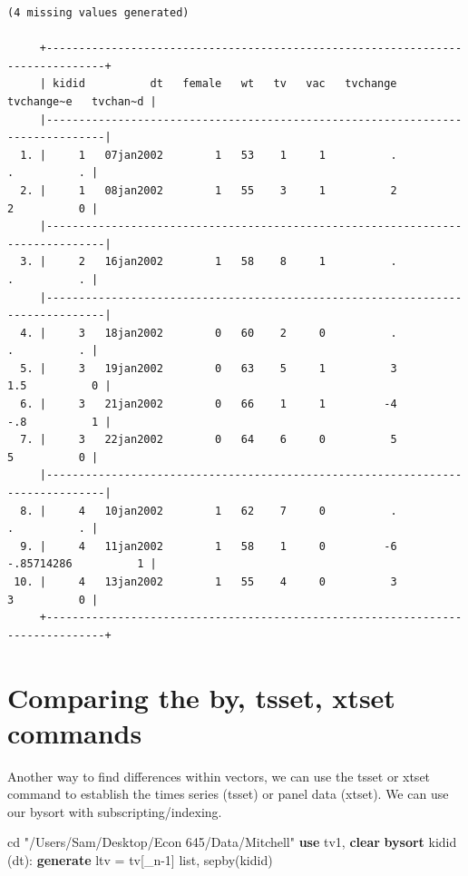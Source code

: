 \documentclass[
]{book}
\newenvironment{Shaded}{\begin{snugshade}}{\end{snugshade}}
\newcommand{\DataTypeTok}[1]{\textcolor[rgb]{0.13,0.29,0.53}{#1}}
\newcommand{\KeywordTok}[1]{\textcolor[rgb]{0.13,0.29,0.53}{\textbf{#1}}}
\newcommand{\NormalTok}[1]{#1}
\newcommand{\OtherTok}[1]{\textcolor[rgb]{0.56,0.35,0.01}{#1}}
\newcommand{\StringTok}[1]{\textcolor[rgb]{0.31,0.60,0.02}{#1}}
\begin{document}
\begin{verbatim}
(4 missing values generated)

     +-------------------------------------------------------------------------------+
     | kidid          dt   female   wt   tv   vac   tvchange   tvchange~e   tvchan~d |
     |-------------------------------------------------------------------------------|
  1. |     1   07jan2002        1   53    1     1          .            .          . |
  2. |     1   08jan2002        1   55    3     1          2            2          0 |
     |-------------------------------------------------------------------------------|
  3. |     2   16jan2002        1   58    8     1          .            .          . |
     |-------------------------------------------------------------------------------|
  4. |     3   18jan2002        0   60    2     0          .            .          . |
  5. |     3   19jan2002        0   63    5     1          3          1.5          0 |
  6. |     3   21jan2002        0   66    1     1         -4          -.8          1 |
  7. |     3   22jan2002        0   64    6     0          5            5          0 |
     |-------------------------------------------------------------------------------|
  8. |     4   10jan2002        1   62    7     0          .            .          . |
  9. |     4   11jan2002        1   58    1     0         -6   -.85714286          1 |
 10. |     4   13jan2002        1   55    4     0          3            3          0 |
     +-------------------------------------------------------------------------------+
\end{verbatim}

\section{Comparing the by, tsset, xtset commands}\label{comparing-the-by-tsset-xtset-commands}

Another way to find differences within vectors, we can use the tsset or xtset
command to establish the times series (tsset) or panel data (xtset).
We can use our bysort with subscripting/indexing.

\begin{Shaded}
\begin{Highlighting}[]
\NormalTok{cd }\StringTok{"/Users/Sam/Desktop/Econ 645/Data/Mitchell"}
\KeywordTok{use}\NormalTok{ tv1, }\KeywordTok{clear}
\KeywordTok{bysort}\NormalTok{ kidid (dt): }\KeywordTok{generate}\NormalTok{ ltv = tv[}\DataTypeTok{\_n}\NormalTok{{-}1]}
\OtherTok{list}\NormalTok{, sepby(kidid)}
\end{Highlighting}
\end{Shaded}
\end{document}
